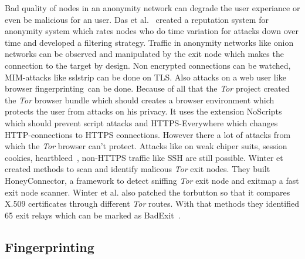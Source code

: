 \documentclass{sig-alternate}
\begin{document}
Bad quality of nodes in an anonymity network can degrade the user experiance or even be malicious for an user. Das et al.~\cite{das2014re} created a reputation system for anonymity system which rates nodes who do time variation for attacks down over time and developed a filtering strategy.
Traffic in anonymity networks like onion networks can be observed and manipulated by the exit node which makes the connection to the target by design. Non encrypted connections can be watched, MIM-attacks like sslstrip can be done on TLS. Also attacks on a web user like browser fingerprinting~\cite{fingerprinting}can be done. Because of all that the \textit{Tor} project created the \textit{Tor} browser bundle which should creates a browser environment which protects the user from attacks on his privacy. It uses the extension NoScripts which should prevent script attacks and HTTPS-Everywhere which changes HTTP-connections to HTTPS connections. However there a lot of attacks from which the \textit{Tor} browser can't protect. Attacks like on weak chiper suits, session cookies, heartbleed~\cite{heartbleed}, non-HTTPS traffic like SSH are still possible. Winter et created methods to scan and identify malicous \textit{Tor} exit nodes. They built HoneyConnector, a framework to detect sniffing \textit{Tor} exit node and exitmap a fast exit node scanner. Winter et al. also patched the torbutton so that it compares X.509 certificates through different \textit{Tor} routes. With that methods they identified 65 exit relays which can be marked as BadExit~\cite{winter2014spoiled}.

\subsection{Fingerprinting}
\end{document}
